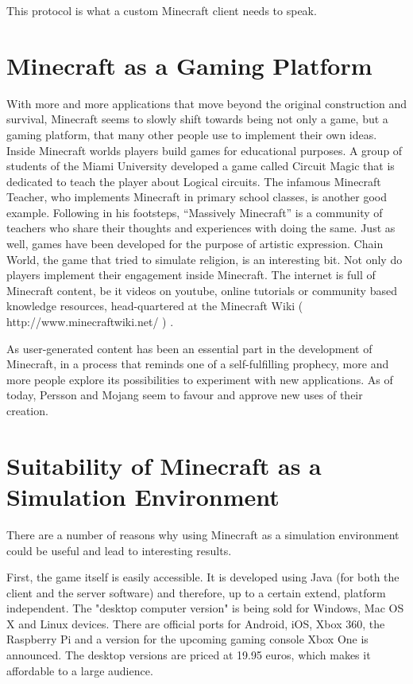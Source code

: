 This protocol is what a custom Minecraft client needs to speak.

    \section{Minecraft as a Gaming Platform}
With more and more applications that move beyond the original construction and survival, Minecraft seems to slowly shift towards being not only a game, but a gaming platform, that many other people use to implement their own ideas. Inside Minecraft worlds players build games for educational purposes. A group of students of the Miami University developed a game called Circuit Magic that is dedicated to teach the player about Logical circuits. The infamous Minecraft Teacher, who implements Minecraft in primary school classes, is another good example. Following in his footsteps, ``Massively Minecraft'' is a community of teachers who share their thoughts and experiences with doing the same. Just as well, games have been developed for the purpose of artistic expression. Chain World, the game that tried to simulate religion, is an interesting bit. Not only do players implement their engagement inside Minecraft. The internet is full of Minecraft content, be it videos on youtube, online tutorials or community based knowledge resources, head-quartered at the Minecraft Wiki ( http://www.minecraftwiki.net/ ) .~\cite{Duncan:2011:MBC:2207096.2207097}

As user-generated content has been an essential part in the development of Minecraft, in a process that reminds one of a self-fulfilling prophecy, more and more people explore its possibilities to experiment with new applications. As of today, Persson and Mojang seem to favour and approve new uses of their creation.~\cite{Duncan:2011:MBC:2207096.2207097}

    \section{Suitability of Minecraft as a Simulation Environment}
There are a number of reasons why using Minecraft as a simulation environment could be useful and lead to interesting results.

First, the game itself is easily accessible. It is developed using Java (for both the client and the server software) and therefore, up to a certain extend, platform independent. The "desktop computer version" is being sold for Windows, Mac OS X and Linux devices. There are official ports for Android, iOS, Xbox 360, the Raspberry Pi and a version for the upcoming gaming console Xbox One is announced. The desktop versions are priced at 19.95 euros, which makes it affordable to a large audience.

